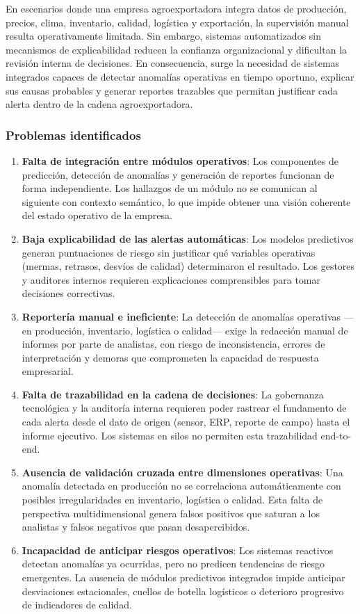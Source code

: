 En escenarios donde una empresa agroexportadora integra datos de
producción, precios, clima, inventario, calidad, logística y
exportación, la supervisión manual resulta operativamente limitada. Sin
embargo, sistemas automatizados sin mecanismos de explicabilidad reducen
la confianza organizacional y dificultan la revisión interna de
decisiones. En consecuencia, surge la necesidad de sistemas integrados
capaces de detectar anomalías operativas en tiempo oportuno, explicar
sus causas probables y generar reportes trazables que permitan
justificar cada alerta dentro de la cadena agroexportadora.

\subsubsection{Problemas identificados}\label{problemas-identificados}

\begin{enumerate}
\def\labelenumi{\arabic{enumi}.}
\item
  \textbf{Falta de integración entre módulos operativos}: Los
  componentes de predicción, detección de anomalías y generación de
  reportes funcionan de forma independiente. Los hallazgos de un módulo
  no se comunican al siguiente con contexto semántico, lo que impide
  obtener una visión coherente del estado operativo de la empresa.
\item
  \textbf{Baja explicabilidad de las alertas automáticas}: Los modelos
  predictivos generan puntuaciones de riesgo sin justificar qué
  variables operativas (mermas, retrasos, desvíos de calidad)
  determinaron el resultado. Los gestores y auditores internos requieren
  explicaciones comprensibles para tomar decisiones correctivas.
\item
  \textbf{Reportería manual e ineficiente}: La detección de anomalías
  operativas ---en producción, inventario, logística o calidad--- exige
  la redacción manual de informes por parte de analistas, con riesgo de
  inconsistencia, errores de interpretación y demoras que comprometen la
  capacidad de respuesta empresarial.
\item
  \textbf{Falta de trazabilidad en la cadena de decisiones}: La
  gobernanza tecnológica y la auditoría interna requieren poder rastrear
  el fundamento de cada alerta desde el dato de origen (sensor, ERP,
  reporte de campo) hasta el informe ejecutivo. Los sistemas en silos no
  permiten esta trazabilidad end-to-end.
\item
  \textbf{Ausencia de validación cruzada entre dimensiones operativas}:
  Una anomalía detectada en producción no se correlaciona
  automáticamente con posibles irregularidades en inventario, logística
  o calidad. Esta falta de perspectiva multidimensional genera falsos
  positivos que saturan a los analistas y falsos negativos que pasan
  desapercibidos.
\item
  \textbf{Incapacidad de anticipar riesgos operativos}: Los sistemas
  reactivos detectan anomalías ya ocurridas, pero no predicen tendencias
  de riesgo emergentes. La ausencia de módulos predictivos integrados
  impide anticipar desviaciones estacionales, cuellos de botella
  logísticos o deterioro progresivo de indicadores de calidad.
\end{enumerate}

